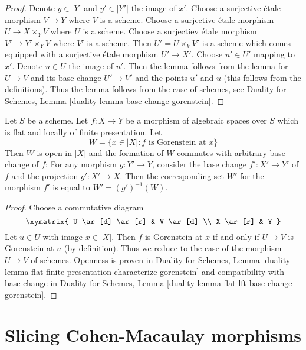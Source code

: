 \begin{proof}
Denote $y \in |Y|$ and $y' \in |Y'|$ the image of $x'$.
Choose a surjective \'etale morphism $V \to Y$ where $V$ is a scheme.
Choose a surjective \'etale morphism $U \to X \times_Y V$ where
$U$ is a scheme.
Choose a surjectiev \'etale morphism $V' \to Y' \times_Y V$
where $V'$ is a scheme.
Then $U' = U \times_V V'$ is a scheme which comes equipped
with a surjective \'etale morphism $U' \to X'$.
Choose $u' \in U'$ mapping to $x'$. Denote $u \in U$ the image of $u'$.
Then the lemma follows from the lemma for
$U \to V$ and its base change $U' \to V'$ and the
points $u'$ and $u$ (this follows from the definitions).
Thus the lemma follows from the case of schemes, see
Duality for Schemes, Lemma \ref{duality-lemma-base-change-gorenstein}.
\end{proof}

\begin{lemma}
\label{lemma-flat-finite-presentation-gorenstein-open}
Let $S$ be a scheme.
Let $f : X \to Y$ be a morphism of algebraic spaces over $S$
which is flat and locally of finite presentation. Let
$$
W = \{x \in |X| : f\text{ is Gorenstein at }x\}
$$
Then $W$ is open in $|X|$ and the formation of $W$
commutes with arbitrary base change of $f$:
For any morphism $g : Y' \to Y$, consider
the base change $f' : X' \to Y'$ of $f$ and the
projection $g' : X' \to X$. Then the corresponding
set $W'$ for the morphism $f'$ is equal to $W' = (g')^{-1}(W)$.
\end{lemma}

\begin{proof}
Choose a commutative diagram
$$
\xymatrix{
U \ar[d] \ar[r] & V \ar[d] \\
X \ar[r] & Y
}
$$
Let $u \in U$ with image $x \in |X|$.
Then $f$ is Gorenstein at $x$ if and only if $U \to V$ is
Gorenstein at $u$ (by definition).
Thus we reduce to the case of the morphism $U \to V$
of schemes. Openness is proven in
Duality for Schemes, Lemma
\ref{duality-lemma-flat-finite-presentation-characterize-gorenstein}
and compatibility with base change in
Duality for Schemes, Lemma \ref{duality-lemma-flat-lft-base-change-gorenstein}.
\end{proof}










\section{Slicing Cohen-Macaulay morphisms}
\label{section-slice}

